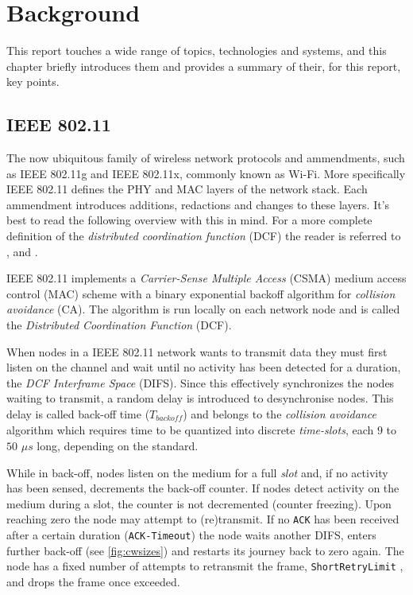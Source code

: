 
\chapter{Background}

This report touches a wide range of topics, technologies and systems, and this
chapter briefly introduces them and provides a summary of their, for this
report, key points.

\section{IEEE 802.11}

The now ubiquitous family of wireless network protocols and ammendments, such
as IEEE 802.11g and IEEE 802.11x, commonly known as Wi-Fi. More specifically
IEEE 802.11 defines the PHY and MAC layers of the network stack. Each
ammendment introduces additions, redactions and changes to these layers. It's
best to read the following overview with this in mind. For a more complete
definition of the \emph{distributed coordination function} (DCF) the reader is
referred to \cite{654749}, \cite{5307322} and \cite{6687187}. 

IEEE 802.11 implements a \emph{Carrier-Sense Multiple Access} (CSMA) medium
access control (MAC) scheme with a binary exponential backoff algorithm for
\emph{collision avoidance} (CA). The algorithm is run locally on each network
node and is called the \emph{Distributed Coordination Function} (DCF). 

When nodes in a IEEE 802.11 network wants to transmit data they must first
listen on the channel and wait until no activity has been detected for a
duration, the \emph{DCF Interframe Space} (DIFS). Since this effectively
synchronizes the nodes waiting to transmit, a random delay is introduced to
desynchronise nodes. This delay is called back-off time
($T_{\mathit{backoff}}$) and belongs to the \emph{collision avoidance}
algorithm which requires time to be quantized into discrete \emph{time-slots},
each $9$ to $50$ $\mu s$ long, depending on the standard. 

While in back-off, nodes listen on the medium for a full \emph{slot} and, if
no activity has been sensed, decrements the back-off counter. If nodes detect
activity on the medium during a slot, the counter is not decremented (counter
freezing). Upon reaching zero the node may attempt to (re)transmit. If no
\texttt{ACK} has been received after a certain duration (\texttt{ACK-Timeout})
the node waits another DIFS, enters further back-off (see \ref{fig:cwsizes})
and restarts its journey back to zero again. The node has a fixed number of
attempts to retransmit the frame, \texttt{ShortRetryLimit} \cite{654749}, and
drops the frame once exceeded.

